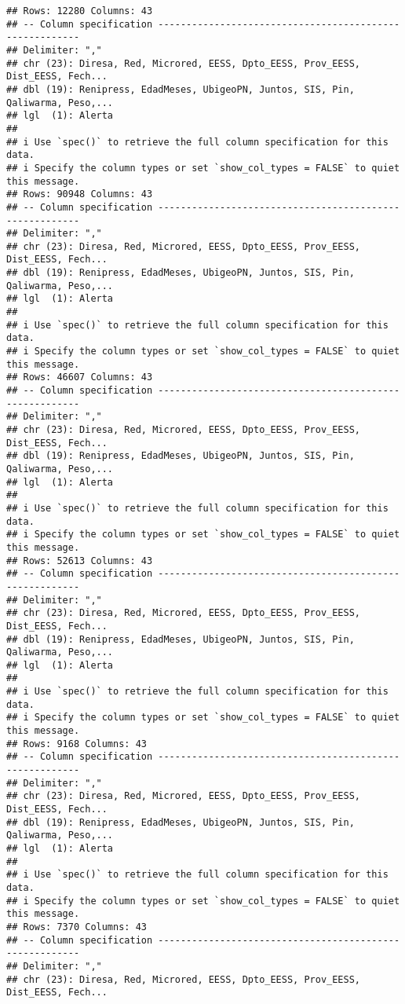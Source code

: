 \documentclass[
]{article}
\begin{document}
\begin{verbatim}
## Rows: 12280 Columns: 43
## -- Column specification --------------------------------------------------------
## Delimiter: ","
## chr (23): Diresa, Red, Microred, EESS, Dpto_EESS, Prov_EESS, Dist_EESS, Fech...
## dbl (19): Renipress, EdadMeses, UbigeoPN, Juntos, SIS, Pin, Qaliwarma, Peso,...
## lgl  (1): Alerta
## 
## i Use `spec()` to retrieve the full column specification for this data.
## i Specify the column types or set `show_col_types = FALSE` to quiet this message.
## Rows: 90948 Columns: 43
## -- Column specification --------------------------------------------------------
## Delimiter: ","
## chr (23): Diresa, Red, Microred, EESS, Dpto_EESS, Prov_EESS, Dist_EESS, Fech...
## dbl (19): Renipress, EdadMeses, UbigeoPN, Juntos, SIS, Pin, Qaliwarma, Peso,...
## lgl  (1): Alerta
## 
## i Use `spec()` to retrieve the full column specification for this data.
## i Specify the column types or set `show_col_types = FALSE` to quiet this message.
## Rows: 46607 Columns: 43
## -- Column specification --------------------------------------------------------
## Delimiter: ","
## chr (23): Diresa, Red, Microred, EESS, Dpto_EESS, Prov_EESS, Dist_EESS, Fech...
## dbl (19): Renipress, EdadMeses, UbigeoPN, Juntos, SIS, Pin, Qaliwarma, Peso,...
## lgl  (1): Alerta
## 
## i Use `spec()` to retrieve the full column specification for this data.
## i Specify the column types or set `show_col_types = FALSE` to quiet this message.
## Rows: 52613 Columns: 43
## -- Column specification --------------------------------------------------------
## Delimiter: ","
## chr (23): Diresa, Red, Microred, EESS, Dpto_EESS, Prov_EESS, Dist_EESS, Fech...
## dbl (19): Renipress, EdadMeses, UbigeoPN, Juntos, SIS, Pin, Qaliwarma, Peso,...
## lgl  (1): Alerta
## 
## i Use `spec()` to retrieve the full column specification for this data.
## i Specify the column types or set `show_col_types = FALSE` to quiet this message.
## Rows: 9168 Columns: 43
## -- Column specification --------------------------------------------------------
## Delimiter: ","
## chr (23): Diresa, Red, Microred, EESS, Dpto_EESS, Prov_EESS, Dist_EESS, Fech...
## dbl (19): Renipress, EdadMeses, UbigeoPN, Juntos, SIS, Pin, Qaliwarma, Peso,...
## lgl  (1): Alerta
## 
## i Use `spec()` to retrieve the full column specification for this data.
## i Specify the column types or set `show_col_types = FALSE` to quiet this message.
## Rows: 7370 Columns: 43
## -- Column specification --------------------------------------------------------
## Delimiter: ","
## chr (23): Diresa, Red, Microred, EESS, Dpto_EESS, Prov_EESS, Dist_EESS, Fech...

\end{verbatim}
\end{document}
